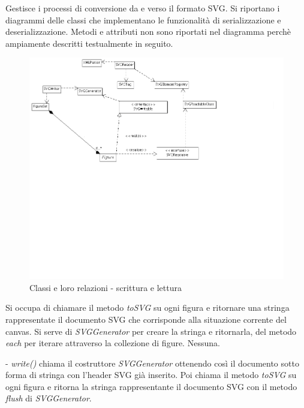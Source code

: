 Gestisce i processi di conversione da e verso il formato SVG. Si riportano i diagrammi delle classi che implementano le funzionalit\`a di serializzazione e deserializzazione. Metodi e attributi non sono riportati nel diagramma perch\`e ampiamente descritti testualmente in seguito.

\begin{figure}[!ht]
\centering
\includegraphics[scale=0.5]{applogic_readwrite.png}
\caption{Classi e loro relazioni - scrittura e lettura}
\end{figure}

Si occupa di chiamare il metodo \textit{toSVG} su ogni figura e ritornare una stringa rappresentate il documento SVG che corrisponde alla situazione corrente del canvas.
Si serve di \textit{SVGGenerator} per creare la stringa e ritornarla, del metodo \textit{each} per iterare attraverso la collezione di figure.
Nessuna.
\begin{elencopuntato}[\subsubsecindent]
\item[-]  \textit{write()} chiama il costruttore \textit{SVGGenerator} ottenendo cos\`i il documento sotto forma di stringa con l'header SVG gi\`a inserito. Poi chiama il metodo \textit{toSVG} su ogni figura e ritorna la stringa rappresentante il documento SVG con il metodo \textit{flush} di \textit{SVGGenerator}.
\end{elencopuntato}

